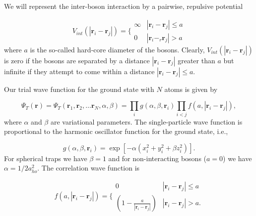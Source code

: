 \documentclass[]{article}
\begin{document}
We will represent the inter-boson interaction by a pairwise,
repulsive potential

\begin{equation}
    V_{int}(|\mathbf{r}_i-\mathbf{r}_j|) =  \Bigg\{
        \begin{array}{ll}
            \infty & {|\mathbf{r}_i-\mathbf{r}_j|} \leq {a}\\
            0 & {|\mathbf{r}_i-_r\mathbf{r}_j|} > {a}
        \end{array}
\end{equation}
where $a$ is the so-called hard-core diameter of the bosons.
Clearly, $V_{int}(|\mathbf{r}_i-\mathbf{r}_j|)$ is zero if the bosons are
separated by a distance $|\mathbf{r}_i-\mathbf{r}_j|$ greater than $a$ but
infinite if they attempt to come within a distance $|\mathbf{r}_i-\mathbf{r}_j| \leq a$.

Our trial wave function for the ground state with $N$ atoms is given by

\begin{equation}
    \Psi_T(\mathbf{r})=\Psi_T(\mathbf{r}_1, \mathbf{r}_2, \dots \mathbf{r}_N,\alpha,\beta)=\prod_i g(\alpha,\beta,\mathbf{r}_i)\prod_{i<j}f(a,|\mathbf{r}_i-\mathbf{r}_j|),
    \label{eq:trialwf}
\end{equation}
where $\alpha$ and $\beta$ are variational parameters. The
single-particle wave function is proportional to the harmonic
oscillator function for the ground state, i.e.,

\begin{equation}
    g(\alpha,\beta,\mathbf{r}_i)= \exp{[-\alpha(x_i^2+y_i^2+\beta z_i^2)]}.
\end{equation}
For spherical traps we have $\beta = 1$ and for non-interacting
bosons ($a=0$) we have $\alpha = 1/2a_{ho}^2$.  The correlation wave
function is

\begin{equation}
    f(a,|\mathbf{r}_i-\mathbf{r}_j|)=\Bigg\{
        \begin{array}{ll}
            0 & {|\mathbf{r}_i-\mathbf{r}_j|} \leq {a}\\
            (1-\frac{a}{|\mathbf{r}_i-\mathbf{r}_j|}) & {|\mathbf{r}_i-\mathbf{r}_j|} > {a}.
        \end{array}
\end{equation}
\end{document}
